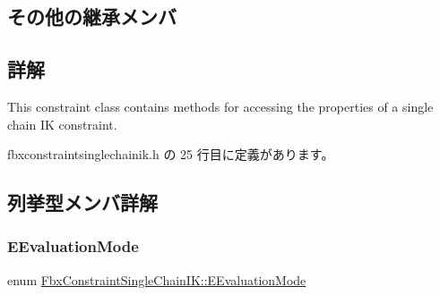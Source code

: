 \subsection*{その他の継承メンバ}


\subsection{詳解}
This constraint class contains methods for accessing the properties of a single chain IK constraint. 

 fbxconstraintsinglechainik.\+h の 25 行目に定義があります。



\subsection{列挙型メンバ詳解}
\mbox{\label{class_fbx_constraint_single_chain_i_k_aa730475e0c3f9f1ecc04e61f39369fc1}} 
\subsubsection{\texorpdfstring{E\+Evaluation\+Mode}{EEvaluationMode}}
{\footnotesize\ttfamily enum \hyperlink{class_fbx_constraint_single_chain_i_k_aa730475e0c3f9f1ecc04e61f39369fc1}{Fbx\+Constraint\+Single\+Chain\+I\+K\+::\+E\+Evaluation\+Mode}}

